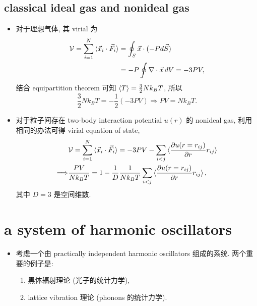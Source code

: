 \subsection{classical ideal gas and nonideal gas}
\begin{itemize}
	\item 对于理想气体, 其 virial 为
	\begin{align}
		\mathcal{V} = \sum_{i = 1}^N \braket{\vec{x}_i \cdot \vec{F}_i} &= \oint_S \vec{x} \cdot (- P d\vec{S}) \notag \\
		&= - P \oint \nabla \cdot \vec{x} \, dV = - 3 P V,
	\end{align}
	结合 equipartition theorem 可知 $\braket{T} = \frac{3}{2} N k_B T$, 所以
	\begin{equation}
		\frac{3}{2} N k_B T = - \frac{1}{2} (- 3 P V) \Longrightarrow P V = N k_B T.
	\end{equation}
	
	\item 对于粒子间存在 two-body interaction potential $u(r)$ 的 nonideal gas, 利用相同的办法可得 virial equation of state,
	\begin{align}
		& \mathcal{V} = \sum_{i = 1}^N \braket{\vec{x}_i \cdot \vec{F}_i} = - 3 P V - \sum_{i < j} \braket{\frac{\partial u(r = r_{i j})}{\partial r} r_{i j}} \notag \\
		\Longrightarrow & \frac{P V}{N k_B T} = 1 - \frac{1}{D} \frac{1}{N k_B T} \sum_{i < j} \braket{\frac{\partial u(r = r_{i j})}{\partial r} r_{i j}}, \label{3.5.12}
	\end{align}
	其中 $D = 3$ 是空间维数.
\end{itemize}

\section{a system of harmonic oscillators}
\begin{itemize}
	\item 考虑一个由 practically independent harmonic oscillators 组成的系统. 两个重要的例子是:
	\begin{enumerate}
		\item 黑体辐射理论 (光子的统计力学),
		
		\item lattice vibration 理论 (phonons 的统计力学).
	\end{enumerate}
\end{itemize}


